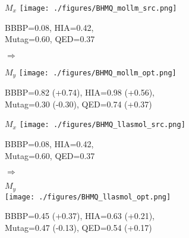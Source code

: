 \begin{figure}[htbp]
    \centering
    \begin{minipage}{0.43\linewidth}
        \centering
        \tiny $M_x$
        \texttt{[image: ./figures/BHMQ\_mollm\_src.png]}
        \par\vspace{2pt}
        \tiny BBBP=0.08, HIA=0.42, \\
        \tiny Mutag=0.60, QED=0.37
    \end{minipage}
    \hfill
    \begin{minipage}{0.1\linewidth}
        \centering \Large$\Rightarrow$\\
        \raggedright \tiny \mollm
        \raggedright \tiny {}
    \end{minipage}
    \hfill
    \begin{minipage}{0.43\linewidth}
        \centering
        \tiny $M_y$
        \texttt{[image: ./figures/BHMQ\_mollm\_opt.png]}
        \par\vspace{2pt}
        \tiny BBBP=0.82 (+0.74), HIA=0.98 (+0.56),\\ 
        \tiny Mutag=0.30 (-0.30), QED=0.74 (+0.37)
    \end{minipage}

    \vspace{1em}

    \begin{minipage}{0.43\linewidth}
        \centering
        \tiny $M_x$
        \texttt{[image: ./figures/BHMQ\_llasmol\_src.png]}
        \par\vspace{2pt}
        \tiny BBBP=0.08, HIA=0.42, \\
        \tiny Mutag=0.60, QED=0.37
    \end{minipage}
    \hfill
    \begin{minipage}{0.1\linewidth}
        \centering \Large$\Rightarrow$\\
        \raggedright \tiny \LlaSMol
        \raggedright \tiny {}
    \end{minipage}
    \hfill
    \begin{minipage}{0.43\linewidth}
        \centering
        \tiny $M_y$\\
        \texttt{[image: ./figures/BHMQ\_llasmol\_opt.png]}
        \par\vspace{1pt}
        \tiny BBBP=0.45 (+0.37), HIA=0.63 (+0.21),\\ 
        \tiny Mutag=0.47 (-0.13), QED=0.54 (+0.17)
    \end{minipage}
\end{figure}
